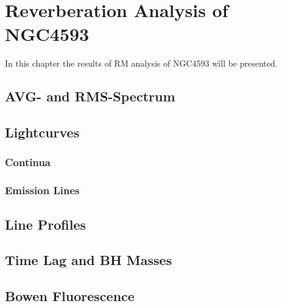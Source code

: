 \chapter{Reverberation Analysis of NGC4593}

In this chapter the results of RM analysis of NGC4593 will be presented. 

\section{AVG- and RMS-Spectrum}

\section{Lightcurves}

\subsection{Continua}

\subsection{Emission Lines}

\section{Line Profiles}

\section{Time Lag and BH Masses}

\section{Bowen Fluorescence}